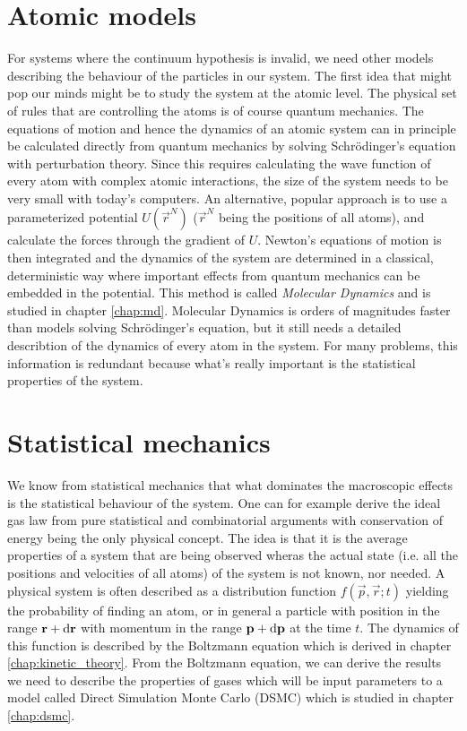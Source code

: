 \section{Atomic models}
For systems where the continuum hypothesis is invalid, we need other models describing the behaviour of the particles in our system. The first idea that might pop our minds might be to study the system at the atomic level. The physical set of rules that are controlling the atoms is of course quantum mechanics. The equations of motion and hence the dynamics of an atomic system can in principle be calculated directly from quantum mechanics by solving Schr\"{o}dinger's equation with perturbation theory. Since this requires calculating the wave function of every atom with complex atomic interactions, the size of the system needs to be very small with today's computers. An alternative, popular approach is to use a parameterized potential $U(\vec r^N)$ ($\vec r^N$ being the positions of all atoms), and calculate the forces through the gradient of $U$. Newton's equations of motion is then integrated and the dynamics of the system are determined in a classical, deterministic way where important effects from quantum mechanics can be embedded in the potential. This method is called \textit{Molecular Dynamics} and is studied in chapter \ref{chap:md}. Molecular Dynamics is orders of magnitudes faster than models solving Schr\"{o}dinger's equation, but it still needs a detailed describtion of the dynamics of every atom in the system. For many problems, this information is redundant because what's really important is the statistical properties of the system.
\section{Statistical mechanics}
We know from statistical mechanics that what dominates the macroscopic effects is the statistical behaviour of the system. One can for example derive the ideal gas law from pure statistical and combinatorial arguments with conservation of energy being the only physical concept\cite{ravndal2008statmech}. The idea is that it is the average properties of a system that are being observed wheras the actual state (i.e. all the positions and velocities of all atoms) of the system is not known, nor needed. A physical system is often described as a distribution function $f(\vec p, \vec r; t)$ yielding the probability of finding an atom, or in general a particle with position in the range $\mathbf r + \mathrm{d}\mathbf r$ with momentum in the range $\mathbf p + \mathrm{d}\mathbf p$ at the time $t$. The dynamics of this function is described by the Boltzmann equation which is derived in chapter \ref{chap:kinetic_theory}. From the Boltzmann equation, we can derive the results we need to describe the properties of gases which will be input parameters to a model called Direct Simulation Monte Carlo (DSMC) which is studied in chapter \ref{chap:dsmc}. 

